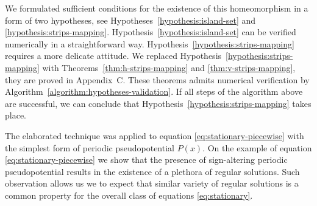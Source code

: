 We formulated sufficient conditions for the existence of this	 homeomorphism in a form of two hypotheses, see Hypotheses~\ref{hypothesis:island-set} and \ref{hypothesis:strips-mapping}.
Hypothesis~\ref{hypothesis:island-set} can be verified numerically in a straightforward way.
Hypothesis~\ref{hypothesis:strips-mapping} requires a more delicate attitude.
We replaced Hypothesis~\ref{hypothesis:strips-mapping} with Theorems~\ref{thm:h-strips-mapping} and \ref{thm:v-strips-mapping}, they are proved in Appendix~C. %
These theorems admits numerical verification by Algorithm~\ref{algorithm:hypotheses-validation}.
If all steps of the algorithm above are successful, we can conclude that Hypothesis~\ref{hypothesis:strips-mapping} takes place. 

The elaborated technique was applied to equation \eqref{eq:stationary-piecewise} with the simplest form of periodic pseudopotential $P(x)$.
On the example of equation \eqref{eq:stationary-piecewise} we show that the presence of sign-altering periodic pseudopotential results in the existence of a plethora of regular solutions.
Such observation allows us we to expect that similar variety of regular solutions is a common property for the overall class of equations \eqref{eq:stationary}.
